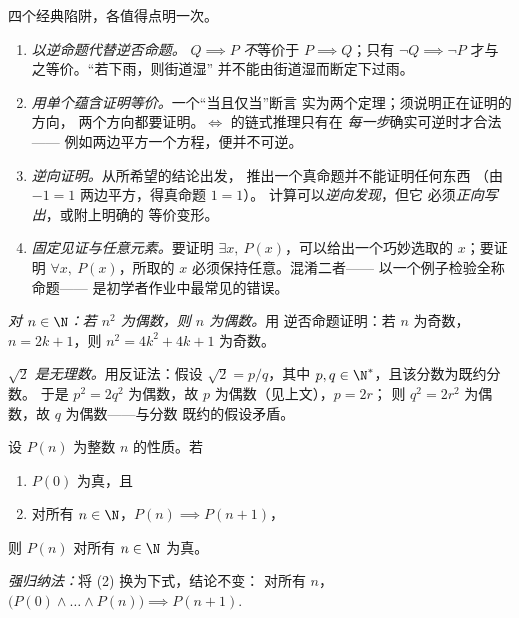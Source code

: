 \begin{remark}[证明中的常见误区]\label{rem:b1:logic:pitfalls}
四个经典陷阱，各值得点明一次。
\begin{enumerate}
  \item \emph{以逆命题代替逆否命题。} $Q \implies P$
        \emph{不}等价于 $P \implies Q$；只有 $\lnot Q
        \implies \lnot P$ 才与之等价。“若下雨，则街道湿”
        并不能由街道湿而断定下过雨。
  \item \emph{用单个蕴含证明等价。}一个“当且仅当”断言
        实为两个定理；须说明正在证明的方向，
        两个方向都要证明。$\iff$ 的链式推理只有在
        \emph{每一步}确实可逆时才合法——
        例如两边平方一个方程，便并不可逆。
  \item \emph{逆向证明。}从所希望的结论出发，
        推出一个真命题并不能证明任何东西
        （由 $-1 = 1$ 两边平方，得真命题 $1 = 1$）。
        计算可以\emph{逆向发现}，但它
        必须\emph{正向写出}，或附上明确的
        等价变形。
  \item \emph{固定见证与任意元素。}要证明
        $\exists x,\ P(x)$，可以给出一个巧妙选取的
        $x$；要证明 $\forall x,\ P(x)$，所取的 $x$
        必须保持任意。混淆二者——
        以一个例子检验全称命题——
        是初学者作业中最常见的错误。
\end{enumerate}
\end{remark}

\begin{example}[逆否命题与反证法的应用]\label{ex:b1:logic:sqrt2}
\emph{对 $n \in \N$：若 $n^2$ 为偶数，则 $n$ 为偶数。}用
逆否命题证明：若 $n$ 为奇数，$n = 2k+1$，则
$n^2 = 4k^2 + 4k + 1$ 为奇数。

\emph{$\sqrt 2$ 是无理数。}用反证法：假设
$\sqrt 2 = p/q$，其中 $p, q \in \N^*$，且该分数为既约分数。
于是 $p^2 = 2q^2$ 为偶数，故 $p$ 为偶数（见上文），$p = 2r$；
则 $q^2 = 2r^2$ 为偶数，故 $q$ 为偶数——与分数
既约的假设矛盾。
\end{example}

\begin{theorem}[数学归纳法]\label{thm:b1:logic:induction}
设 $P(n)$ 为整数 $n$ 的性质。若
\begin{enumerate}
  \item $P(0)$ 为真，且
  \item 对所有 $n \in \N$，$P(n) \implies P(n+1)$，
\end{enumerate}
则 $P(n)$ 对所有 $n \in \N$ 为真。

\emph{强归纳法：}将 (2) 换为下式，结论不变：
对所有 $n$，$\bigl(P(0) \land \dots \land P(n)\bigr) \implies
P(n+1)$.
\end{theorem}

